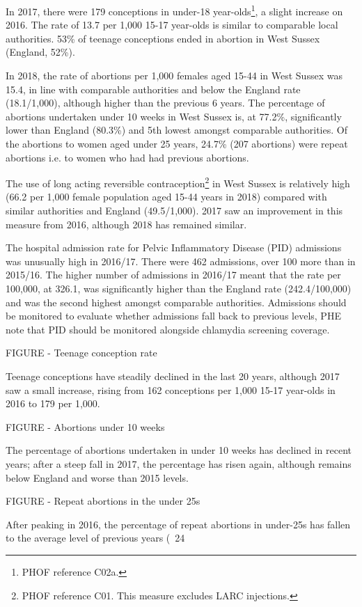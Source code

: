 In 2017, there were 179 conceptions in under-18 year-olds\footnote{PHOF reference C02a.}, a slight increase on 2016. The rate of 13.7 per 1,000 15-17 year-olds is similar to comparable local authorities. 53\% of teenage conceptions ended in abortion in West Sussex (England, 52\%).

In 2018, the rate of abortions per 1,000 females aged 15-44 in West Sussex was 15.4, in line with comparable authorities and below the England rate (18.1/1,000), although higher than the previous 6 years. The percentage of abortions undertaken under 10 weeks in West Sussex is, at 77.2\%, significantly lower than England (80.3\%) and 5th lowest amongst comparable authorities. Of the abortions to women aged under 25 years, 24.7\% (207 abortions) were repeat abortions i.e. to women who had had previous abortions.

The use of long acting reversible contraception\footnote{PHOF reference C01. This measure excludes LARC injections.} in West Sussex is relatively high (66.2 per 1,000 female population aged 15-44 years in 2018) compared with similar authorities and England (49.5/1,000). 2017 saw an improvement in this measure from 2016, although 2018 has remained similar.

The hospital admission rate for Pelvic Inflammatory Disease (PID) admissions was unusually high in 2016/17. There were 462 admissions, over 100 more than in 2015/16. The higher number of admissions in 2016/17 meant that the rate per 100,000, at 326.1, was significantly higher than the England rate (242.4/100,000) and was the second highest amongst comparable authorities. Admissions should be monitored to evaluate whether admissions fall back to previous levels, PHE note that PID should be monitored alongside chlamydia screening coverage.
 
FIGURE - Teenage conception rate

Teenage conceptions have steadily declined in the last 20 years, although 2017 saw a small increase, rising from 162 conceptions per 1,000 15-17 year-olds in 2016 to 179 per 1,000.

FIGURE - Abortions under 10 weeks

The percentage of abortions undertaken in under 10 weeks has declined in recent years; after a steep fall in 2017, the percentage has risen again, although remains below England and worse than 2015 levels.

FIGURE - Repeat abortions in the under 25s

After peaking in 2016, the percentage of repeat abortions in under-25s has fallen to the average level of previous years (~24%

